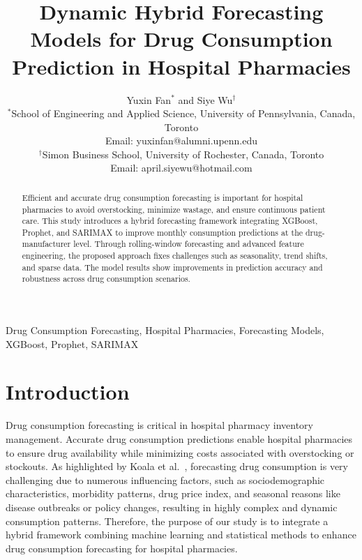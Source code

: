 \documentclass[journal]{IEEEtran}
\begin{document}
\title{Dynamic Hybrid Forecasting Models for Drug Consumption Prediction in Hospital Pharmacies}

\author{Yuxin Fan$^{*}$ and Siye Wu$^{\dagger}$ \\
$^{*}$School of Engineering and Applied Science, University of Pennsylvania, Canada, Toronto \\
Email: yuxinfan@alumni.upenn.edu \\
$^{\dagger}$Simon Business School, University of Rochester, Canada, Toronto \\
Email: april.siyewu@hotmail.com}

\maketitle

\begin{abstract}
Efficient and accurate drug consumption forecasting is important for hospital pharmacies to avoid overstocking, minimize wastage, and ensure continuous patient care. This study introduces a hybrid forecasting framework integrating XGBoost, Prophet, and SARIMAX to improve monthly consumption predictions at the drug-manufacturer level. Through rolling-window forecasting and advanced feature engineering, the proposed approach fixes challenges such as seasonality, trend shifts, and sparse data. The model results show improvements in prediction accuracy and robustness across drug consumption scenarios.
\end{abstract}

\begin{IEEEkeywords}
Drug Consumption Forecasting, Hospital Pharmacies, Forecasting Models, XGBoost, Prophet, SARIMAX
\end{IEEEkeywords}

\section{Introduction}

Drug consumption forecasting is critical in hospital pharmacy inventory management. Accurate drug consumption predictions enable hospital pharmacies to ensure drug availability while minimizing costs associated with overstocking or stockouts. As highlighted by Koala et al.~\cite{koala2021factors}, forecasting drug consumption is very challenging due to numerous influencing factors, such as sociodemographic characteristics, morbidity patterns, drug price index, and seasonal reasons like disease outbreaks or policy changes, resulting in highly complex and dynamic consumption patterns. Therefore, the purpose of our study is to integrate a hybrid framework combining machine learning and statistical methods to enhance drug consumption forecasting for hospital pharmacies.
\end{document}

